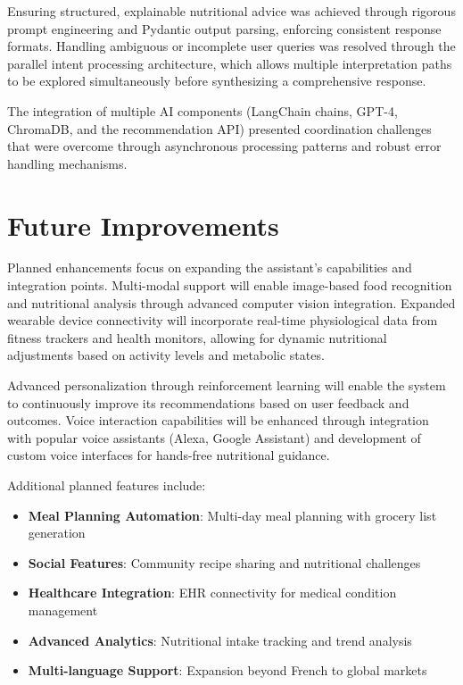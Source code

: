 Ensuring structured, explainable nutritional advice was achieved through rigorous prompt engineering and Pydantic output parsing, enforcing consistent response formats. Handling ambiguous or incomplete user queries was resolved through the parallel intent processing architecture, which allows multiple interpretation paths to be explored simultaneously before synthesizing a comprehensive response.

The integration of multiple AI components (LangChain chains, GPT-4, ChromaDB, and the recommendation API) presented coordination challenges that were overcome through asynchronous processing patterns and robust error handling mechanisms.

\section{Future Improvements}
Planned enhancements focus on expanding the assistant's capabilities and integration points. Multi-modal support will enable image-based food recognition and nutritional analysis through advanced computer vision integration. Expanded wearable device connectivity will incorporate real-time physiological data from fitness trackers and health monitors, allowing for dynamic nutritional adjustments based on activity levels and metabolic states.

Advanced personalization through reinforcement learning will enable the system to continuously improve its recommendations based on user feedback and outcomes. Voice interaction capabilities will be enhanced through integration with popular voice assistants (Alexa, Google Assistant) and development of custom voice interfaces for hands-free nutritional guidance.

Additional planned features include:
\begin{itemize}
\item \textbf{Meal Planning Automation}: Multi-day meal planning with grocery list generation
\item \textbf{Social Features}: Community recipe sharing and nutritional challenges
\item \textbf{Healthcare Integration}: EHR connectivity for medical condition management
\item \textbf{Advanced Analytics}: Nutritional intake tracking and trend analysis
\item \textbf{Multi-language Support}: Expansion beyond French to global markets
\end{itemize}

